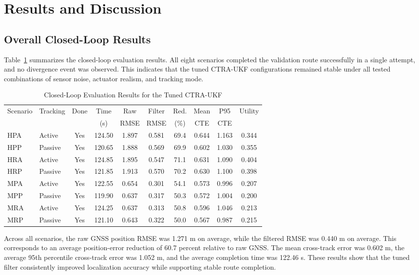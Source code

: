 \documentclass[conference]{IEEEtran}
\begin{document}
\section{Results and Discussion}
\label{sec:results}

\subsection{Overall Closed-Loop Results}

Table~\ref{tab:main_results} summarizes the closed-loop evaluation results. All eight scenarios completed the validation route successfully in a single attempt, and no divergence event was observed. This indicates that the tuned CTRA-UKF configurations remained stable under all tested combinations of sensor noise, actuator realism, and tracking mode.

\begin{table}[!t]
\renewcommand{\arraystretch}{1.15}
\caption{Closed-Loop Evaluation Results for the Tuned CTRA-UKF}
\label{tab:main_results}
\centering
\scriptsize
\begin{tabular}{@{}llcccccccc@{}}
\toprule
Scenario & Tracking & Done & Time & Raw & Filter & Red. & Mean & P95 & Utility \\
 &  &  & (s) & RMSE & RMSE & (\%) & CTE & CTE &  \\
\midrule
HPA & Active  & Yes & 124.50 & 1.897 & 0.581 & 69.4 & 0.644 & 1.163 & 0.344 \\
HPP & Passive & Yes & 120.65 & 1.888 & 0.569 & 69.9 & 0.602 & 1.030 & 0.355 \\
HRA & Active  & Yes & 124.85 & 1.895 & 0.547 & 71.1 & 0.631 & 1.090 & 0.404 \\
HRP & Passive & Yes & 121.85 & 1.913 & 0.570 & 70.2 & 0.630 & 1.100 & 0.398 \\
MPA & Active  & Yes & 122.55 & 0.654 & 0.301 & 54.1 & 0.573 & 0.996 & 0.207 \\
MPP & Passive & Yes & 119.90 & 0.637 & 0.317 & 50.3 & 0.572 & 1.004 & 0.200 \\
MRA & Active  & Yes & 124.25 & 0.637 & 0.313 & 50.8 & 0.596 & 1.046 & 0.213 \\
MRP & Passive & Yes & 121.10 & 0.643 & 0.322 & 50.0 & 0.567 & 0.987 & 0.215 \\
\bottomrule
\end{tabular}
\end{table}

Across all scenarios, the raw GNSS position RMSE was 1.271 m on average, while the filtered RMSE was 0.440 m on average. This corresponds to an average position-error reduction of 60.7 percent relative to raw GNSS. The mean cross-track error was 0.602 m, the average 95th percentile cross-track error was 1.052 m, and the average completion time was 122.46 s. These results show that the tuned filter consistently improved localization accuracy while supporting stable route completion.
\end{document}
